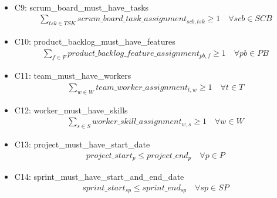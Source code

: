\documentclass{article}
\begin{document}
\begin{itemize}
\begin{align*}
        \end{align*}
    \item C9: scrum\_board\_must\_have\_tasks
        \begin{align*}
            \sum_{tsk \in TSK} scrum\_board\_task\_assignment_{scb, tsk} \geq 1 \quad \forall scb \in SCB
        \end{align*}
    \item C10: product\_backlog\_must\_have\_features
        \begin{align*}
            \sum_{f \in F} product\_backlog\_feature\_assignment_{pb, f} \geq 1 \quad \forall pb \in PB
        \end{align*}
    \item C11: team\_must\_have\_workers
        \begin{align*}
            \sum_{w \in W} team\_worker\_assignment_{t, w} \geq 1 \quad \forall t \in T
        \end{align*}
    \item C12: worker\_must\_have\_skills
        \begin{align*}
            \sum_{s \in S} worker\_skill\_assignment_{w, s} \geq 1 \quad \forall w \in W
        \end{align*}
    \item C13: project\_must\_have\_start\_date
        \begin{align*}
            project\_start_{p} \leq project\_end_{p} \quad \forall p \in P
        \end{align*}
    \item C14: sprint\_must\_have\_start\_and\_end\_date
        \begin{align*}
            sprint\_start_{sp} \leq sprint\_end_{sp} \quad \forall sp \in SP
        \end{align*}
\end{itemize}
\end{document}
